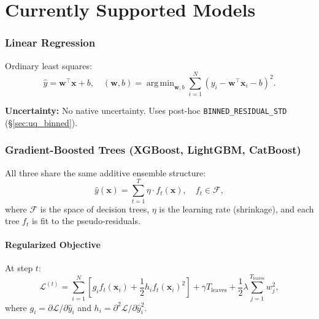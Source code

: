 \documentclass[11pt,a4paper]{article}
\theoremstyle{definition}
\newcommand{\bx}{\mathbf{x}}
\newcommand{\bw}{\mathbf{w}}
\DeclareMathOperator*{\argmin}{arg\,min}
\begin{document}
\part{Currently Supported Models}

\section{Linear Regression}

Ordinary least squares:
\[
  \hat{y} = \bw^\top \bx + b, \quad (\bw, b) = \argmin_{\bw, b} \sum_{i=1}^{N} (y_i - \bw^\top \bx_i - b)^2.
\]

\textbf{Uncertainty:} No native uncertainty. Uses post-hoc
\texttt{BINNED\_RESIDUAL\_STD} (\S\ref{sec:uq_binned}).

\section{Gradient-Boosted Trees (XGBoost, LightGBM, CatBoost)}
\label{sec:gbt}

All three share the same additive ensemble structure:
\[
  \hat{y}(\bx) = \sum_{t=1}^{T} \eta \cdot f_t(\bx), \quad f_t \in \mathcal{F},
\]
where $\mathcal{F}$ is the space of decision trees, $\eta$ is the learning rate
(shrinkage), and each tree $f_t$ is fit to the pseudo-residuals.

\subsection{Regularized Objective}

At step $t$:
\begin{equation}
  \mathcal{L}^{(t)} = \sum_{i=1}^{N} \left[g_i f_t(\bx_i) + \frac{1}{2} h_i f_t(\bx_i)^2\right] + \gamma T_{\mathrm{leaves}} + \frac{1}{2}\lambda \sum_{j=1}^{T_{\mathrm{leaves}}} w_j^2,
  \label{eq:xgb_obj}
\end{equation}
where $g_i = \partial \mathcal{L} / \partial \hat{y}_i$ and $h_i = \partial^2 \mathcal{L} / \partial \hat{y}_i^2$.
\end{document}

